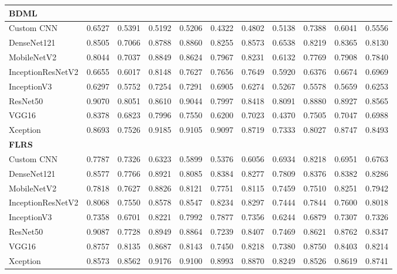 \documentclass[a4paper,fleqn]{cas-dc}
\begin{document}
\begin{table}[t]
\begin{tabular}{l *{10}{r}}
        \midrule
        \multicolumn{11}{l}{\textbf{BDML}} \\
        \midrule
        Custom CNN        & 0.6527 & 0.5391 & 0.5192 & 0.5206 & 0.4322 & 0.4802 & 0.5138 & 0.7388 & 0.6041 & 0.5556 \\
        DenseNet121       & 0.8505 & 0.7066 & 0.8788 & 0.8860 & 0.8255 & 0.8573 & 0.6538 & 0.8219 & 0.8365 & 0.8130 \\
        MobileNetV2       & 0.8044 & 0.7037 & 0.8849 & 0.8624 & 0.7967 & 0.8231 & 0.6132 & 0.7769 & 0.7908 & 0.7840 \\
        InceptionResNetV2 & 0.6655 & 0.6017 & 0.8148 & 0.7627 & 0.7656 & 0.7649 & 0.5920 & 0.6376 & 0.6674 & 0.6969 \\
        InceptionV3       & 0.6297 & 0.5752 & 0.7254 & 0.7291 & 0.6905 & 0.6274 & 0.5267 & 0.5578 & 0.5659 & 0.6253 \\
        ResNet50          & 0.9070 & 0.8051 & 0.8610 & 0.9044 & 0.7997 & 0.8418 & 0.8091 & 0.8880 & 0.8927 & 0.8565 \\
        VGG16             & 0.8378 & 0.6823 & 0.7996 & 0.7550 & 0.6200 & 0.7023 & 0.4370 & 0.7505 & 0.7047 & 0.6988 \\
        Xception          & 0.8693 & 0.7526 & 0.9185 & 0.9105 & 0.9097 & 0.8719 & 0.7333 & 0.8027 & 0.8747 & 0.8493 \\

        \midrule
        \multicolumn{11}{l}{\textbf{FLRS}} \\
        \midrule
        Custom CNN        & 0.7787 & 0.7326 & 0.6323 & 0.5899 & 0.5376 & 0.6056 & 0.6934 & 0.8218 & 0.6951 & 0.6763 \\
        DenseNet121       & 0.8577 & 0.7766 & 0.8921 & 0.8085 & 0.8384 & 0.8277 & 0.7809 & 0.8376 & 0.8382 & 0.8286 \\
        MobileNetV2       & 0.7818 & 0.7627 & 0.8826 & 0.8121 & 0.7751 & 0.8115 & 0.7459 & 0.7510 & 0.8251 & 0.7942 \\
        InceptionResNetV2 & 0.8068 & 0.7550 & 0.8578 & 0.8547 & 0.8234 & 0.8297 & 0.7444 & 0.7844 & 0.7600 & 0.8018 \\
        InceptionV3       & 0.7358 & 0.6701 & 0.8221 & 0.7992 & 0.7877 & 0.7356 & 0.6244 & 0.6879 & 0.7307 & 0.7326 \\
        ResNet50          & 0.9087 & 0.7728 & 0.8949 & 0.8864 & 0.7239 & 0.8407 & 0.7469 & 0.8621 & 0.8762 & 0.8347 \\
        VGG16             & 0.8757 & 0.8135 & 0.8687 & 0.8143 & 0.7450 & 0.8218 & 0.7380 & 0.8750 & 0.8403 & 0.8214 \\
        Xception          & 0.8573 & 0.8562 & 0.9176 & 0.9100 & 0.8993 & 0.8870 & 0.8249 & 0.8526 & 0.8619 & 0.8741 \\


\end{tabular}
\end{table}
\end{document}
